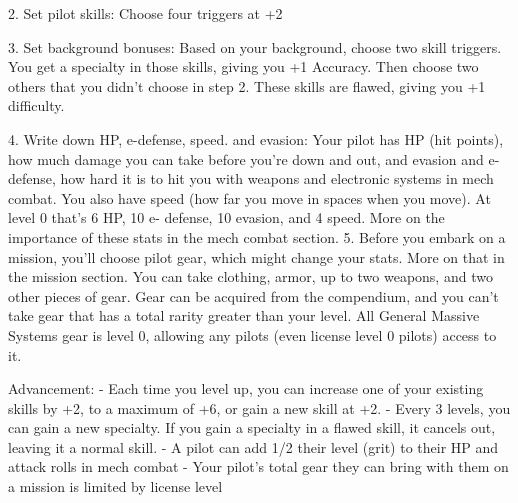    2.   Set pilot skills: Choose four triggers at +2

    3.   Set background bonuses: Based on your background, choose two skill triggers. You get
         a specialty in those skills, giving you +1 Accuracy. Then choose two others that you didn’t
         choose in step 2. These skills are flawed, giving you +1 difficulty.

    4.   Write down HP, e-defense, speed. and evasion: Your pilot has HP (hit points), how much
         damage you can take before you’re down and out, and evasion and e-defense, how
         hard it is to hit you with weapons and electronic systems in mech combat. You also have
         speed (how far you move in spaces when you move). At level 0 that’s 6 HP, 10 e-
         defense, 10 evasion, and 4 speed. More on the importance of these stats in the mech
         combat section.
    5.   Before you embark on a mission, you’ll choose pilot gear, which might change your
         stats. More on that in the mission section. You can take clothing, armor, up to two
         weapons, and two other pieces of gear. Gear can be acquired from the compendium, and
         you can’t take gear that has a total rarity greater than your level. All General Massive
         Systems gear is level 0, allowing any pilots (even license level 0 pilots) access to it.


Advancement:
          - Each time you level up, you can increase one of your existing skills by +2, to a maximum
         of +6, or gain a new skill at +2.
          - Every 3 levels, you can gain a new specialty. If you gain a specialty in a flawed skill, it
         cancels out, leaving it a normal skill.
         - A pilot can add 1/2 their level (grit) to their HP and attack rolls in mech combat
         - Your pilot’s total gear they can bring with them on a mission is limited by license level





